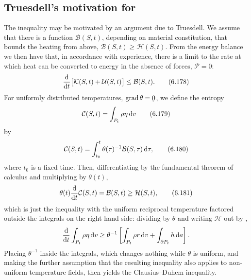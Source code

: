 \subsection*{Truesdell's motivation for }

The inequality may be motivated by an argument due to Truesdell. We
assume that there is a function $\mathcal{B}(S,t)$, depending on
material constitution, that bounds the heating from above,
$\mathcal{B}(S,t)\geq\mathcal{H}(S,t)$. From the energy balance
 we then have that, in accordance with experience, there is
a limit to the rate at which heat can be converted to energy in the
absence of forces, $\mathcal{P}=0$:
\begin{equation}
   \frac{\mathrm{d}}{\mathrm{d} t}\big[\mathcal{K}(S,t)+\mathcal{U}(S,t)\big]
   \leq\mathcal{B}(S,t).
   \tag{6.178}\label{eq:6.178}
\end{equation}
For uniformly distributed temperatures, $\grad\theta=\bze$, we define
the entropy
\begin{equation}
   \mathcal{C}(S,t)=\int_{P_{t}}\rho\eta\,\mathrm{d} v
   \tag{6.179}\label{eq:6.179}
\end{equation}
by
\begin{equation}
   \mathcal{C}(S,t)=\int_{t_{0}}^{t}\theta(\tau)^{-1}
   \mathcal{B}(S,\tau)\,\mathrm{d}\tau ,
   \tag{6.180}\label{eq:6.180}
\end{equation}
where $t_{0}$ is a fixed time. Then, differentiating  by the
fundamental theorem of calculus and multiplying by $\theta(t)$,
\begin{equation}
   \theta(t)\frac{\mathrm{d}}{\mathrm{d} t}\mathcal{C}(S,t)=\mathcal{B}(S,t)
   \geq\mathcal{H}(S,t),
   \tag{6.181}\label{eq:6.181}
\end{equation}
which is just the inequality  with the uniform reciprocal
temperature factored outside the integrals on the right-hand side:
dividing by $\theta$ and writing $\mathcal{H}$ out by ,
\[
   \frac{\mathrm{d}}{\mathrm{d} t}\int_{P_{t}}\rho\eta\,\mathrm{d} v
   \geq\theta^{-1}\left[\int_{P_{t}}\rho r\,\mathrm{d} v
   +\int_{\partial P_{t}}h\,\mathrm{d} a\right].
\]
Placing $\theta^{-1}$ inside the integrals, which changes nothing while
$\theta$ is uniform, and making the further assumption that the
resulting inequality also applies to non-uniform temperature fields,
then yields the Clausius--Duhem inequality.

